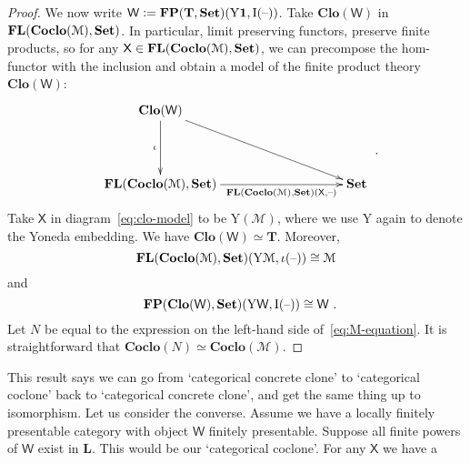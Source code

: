 \documentclass[11pt, a4paper, twoside,leqno]{amsart}
\newcommand{\cat}[1]{\mathbf{#1}}
\newcommand{\thg}{{\mathord{\text{--}}}}
\newcommand{\defeq}{\mathrel{\mathop:}=}
\newcommand{\cd}[2][]{\vcenter{\hbox{\xymatrix#1{#2}}}}
\numberwithin{equation}{section}
\theoremstyle{plain}
\theoremstyle{definition}
\newcommand{\Set}{\cat{Set}}
\newcommand{\aone}{{\mathbf 1}}
\DeclareMathOperator{\FP}{\bf FP}
\DeclareMathOperator{\FL}{\bf FL}
\begin{document}
\begin{proof}
  We now write
  \(\mathsf{W} \defeq \FP(\cat{T},\Set)(\mathrm{Y} \aone,\mathrm{I}
  (\thg))\).
  Take \(\cat{Clo}(\mathsf{W})\) in
  \(\FL(\cat{Coclo}(\mathcal{M}),\Set)\). In particular, limit
  preserving functors, preserve finite products, so for any
  \(\mathsf{X} \in \FL(\cat{Coclo}(\mathcal{M}),\Set)\), we can
  precompose
  the hom-functor with the inclusion and obtain a model of the finite
  product theory \(\cat{Clo}(\mathsf{W})\):
  \begin{equation}
    \label{eq:clo-model}
    \xymatrixcolsep{8pc}
    \xymatrixrowsep{3.5pc}
    \cd{
      {\cat{Clo}(\mathsf{W})}
      \ar[d]_-{\iota} \ar[dr]^-{}
      & \\
      {\FL(\cat{Coclo}(\mathcal{M}),\Set)} \ar[r]_-{\FL(\cat{Coclo}(\mathcal{M}),\Set)( \mathsf{X}, \thg)
      } & {\Set}
    }\rlap{ .}
  \end{equation}
  Take \(\mathsf{X}\) in diagram~\eqref{eq:clo-model} to be
  \(\mathrm{Y}(\mathcal{M}) \), where we use \(\mathrm{Y} \) again to
  denote the Yoneda embedding. We have
  \(\cat{Clo}(\mathsf{W}) \simeq \cat{T}\). Moreover,
  \begin{equation}
    \label{eq:M-equation}
    \FL(\cat{Coclo}(\mathcal{M}),\Set)( \mathrm{Y}
    \mathcal{M}, \iota(\thg)) \cong \mathcal{M}
  \end{equation}
  and
  \begin{equation}
    \label{eq:W-equation}
    \FP(\cat{Clo}(\mathsf{W}),\Set)(\mathrm{Y}
    \mathsf{W},\mathrm{I}
    (\thg)) \cong \mathsf{W} \rlap{ .}
  \end{equation}
  Let \(N\) be equal to the
expression on the left-hand side of~\eqref{eq:M-equation}. It is
straightforward that
\(\cat{Coclo}(N) \simeq \cat{Coclo}(\mathcal{M})\).
\end{proof}
 This result says we can
go from `categorical concrete clone' to `categorical coclone' back to
`categorical concrete clone', and get the same thing up to
isomorphism. Let us consider the converse. Assume we have a locally finitely presentable category with object
\(\mathsf{W}\) finitely presentable. Suppose all finite powers of
\(\mathsf{W}\) exist in \(\cat{L}\). This would be our `categorical coclone'. For any \(\mathsf{X}\) we have a
\end{document}
